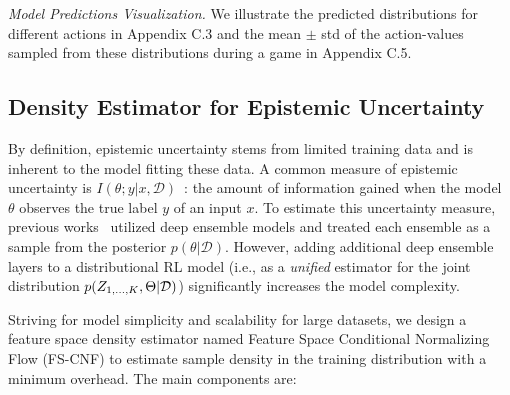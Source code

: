 \documentclass[letterpaper]{article} %
\newcommand{\datapoint}{x}
\newcommand{\state}{s}
\newcommand{\action}{a}
\newcommand{\agentIndex}{k}
\newcommand{\dataset}{\mathcal{D}}
\begin{document}
{\it Model Predictions Visualization.} We illustrate the predicted distributions for different actions in Appendix C.3 and the mean $\pm$ std of the action-values sampled from these distributions during a game in Appendix C.5.

\subsection{Density Estimator for Epistemic Uncertainty }\label{subsec:epistemic-uncertainty}
By definition, epistemic uncertainty stems from limited training data and is inherent to the model fitting these data. A common measure of epistemic uncertainty is $I(\theta; y|\datapoint,\dataset)$~\cite{Smith2018Uncertainty,Amersfoort2020Uncertainty}: the amount of information gained when the model $\theta$ observes the true label $y$ of an input $\datapoint$.
To estimate this uncertainty measure, previous works~\cite{Wen2020BatchEnsemble,Dusenberry2020Bayesian} utilized deep ensemble models and treated each ensemble as a sample from the posterior $p(\theta|\dataset)$. However, adding additional deep ensemble layers to a distributional RL model (i.e., as a {\it unified} estimator for the joint distribution $p(Z_{1,\dots,\MakeUppercase{\agentIndex}},\Theta|\dataset)$) significantly increases the model complexity. 

Striving for model simplicity and scalability for large datasets,  we design a feature space density estimator named Feature Space Conditional Normalizing Flow (FS-CNF) to estimate sample density in the training distribution with a minimum overhead. The main components are:
\end{document}
